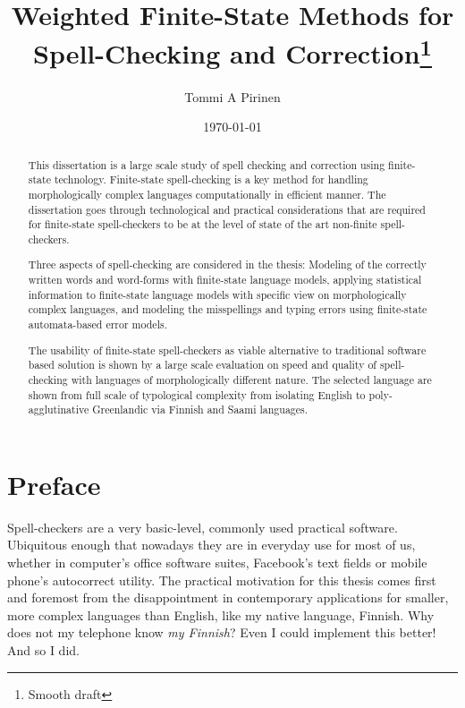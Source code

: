 \documentclass[officiallayout]{unihelcompling}
\title{Weighted Finite-State Methods for 
Spell-Checking
and Correction\footnote{Smooth draft}}
\author{Tommi A Pirinen}
\date{\today}
\begin{document}
\frontmatter

\maketitle

\begin{abstract}
    This dissertation is a large scale study of spell checking and correction
    using finite-state technology. Finite-state spell-checking is a key method
    for handling morphologically complex languages computationally in efficient
    manner. The dissertation goes through technological and practical
    considerations that are required for finite-state spell-checkers to be
    at the level of state of the art non-finite spell-checkers. 

    Three aspects of spell-checking are considered in the thesis: Modeling of
    the correctly written words and word-forms with finite-state language
    models, applying statistical information to finite-state language models
    with specific view on morphologically complex languages, and modeling the
    misspellings and typing errors using finite-state automata-based error
    models.

    The usability of finite-state spell-checkers as viable alternative to
    traditional software based solution is shown by a large scale
    evaluation on speed and quality of spell-checking with languages of
    morphologically different nature. The selected language are shown from
    full scale of typological complexity from isolating English to 
    poly-agglutinative Greenlandic via Finnish and Saami languages.
\end{abstract}

\mainmatter

\chapter*{Preface}
\label{chap:preface}

Spell-checkers are a very basic-level, commonly used practical software.
Ubiquitous enough that nowadays they are in everyday use for most of us,
whether in computer's office software suites, Facebook's text fields or mobile
phone's autocorrect utility. The practical motivation for this thesis comes
first and foremost from the disappointment in contemporary applications for
smaller, more complex languages than English, like my native language, Finnish.
Why does not my telephone know \emph{my Finnish}? Even I could implement this
better! And so I did.
\end{document}
